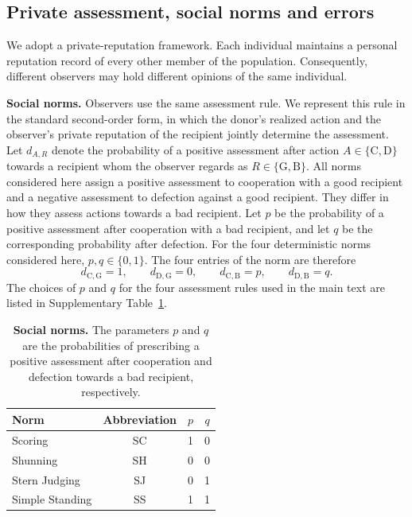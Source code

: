 \documentclass[fleqn,10pt]{wlscirep}
\begin{document}
\subsection{Private assessment, social norms and errors}
\label{sec:si-private-assessment}

We adopt a private-reputation framework. Each individual maintains a personal reputation record of every other member of the population. Consequently, different observers may hold different opinions of the same individual.

\textbf{Social norms.} Observers use the same assessment rule. We represent this rule in the standard second-order form, in which the donor's realized action and the observer's private reputation of the recipient jointly determine the assessment. Let $d_{A,R}$ denote the probability of a positive assessment after action $A\in\{\mathrm{C},\mathrm{D}\}$ towards a recipient whom the observer regards as $R\in\{\mathrm{G},\mathrm{B}\}$. All norms considered here assign a positive assessment to cooperation with a good recipient and a negative assessment to defection against a good recipient. They differ in how they assess actions towards a bad recipient. Let $p$ be the probability of a positive assessment after cooperation with a bad recipient, and let $q$ be the corresponding probability after defection. For the four deterministic norms considered here, $p,q\in\{0,1\}$. The four entries of the norm are therefore
\[
d_{\mathrm{C},\mathrm{G}}=1,\qquad
d_{\mathrm{D},\mathrm{G}}=0,\qquad
d_{\mathrm{C},\mathrm{B}}=p,\qquad
d_{\mathrm{D},\mathrm{B}}=q.
\]
The choices of $p$ and $q$ for the four assessment rules used in the main text are listed in Supplementary Table~\ref{tab:si-norms}.

\begin{table}[H]
\centering
\caption{\textbf{Social norms.} The parameters $p$ and $q$ are the probabilities of prescribing a positive assessment after cooperation and defection towards a bad recipient, respectively.}
\label{tab:si-norms}
\begin{tabular}{lccc}
\toprule
Norm & Abbreviation & $p$ & $q$\\
\midrule
Scoring & SC & 1 & 0\\
Shunning & SH & 0 & 0\\
Stern Judging & SJ & 0 & 1\\
Simple Standing & SS & 1 & 1\\
\bottomrule
\end{tabular}
\end{table}
\end{document}
